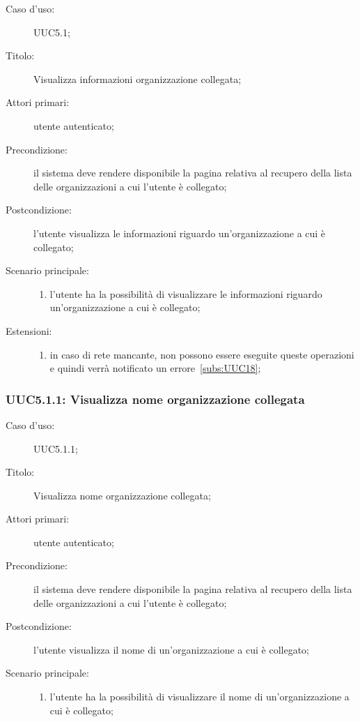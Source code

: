 \documentclass[../../../analisi-dei-requisiti.tex]{subfiles}
\begin{document}
\begin{description}
  \item[Caso d'uso:] UUC5.1;
  \item[Titolo:] Visualizza informazioni organizzazione collegata;
  \item[Attori primari:] utente autenticato;
  \item[Precondizione:] il sistema deve rendere disponibile la pagina relativa al recupero della lista delle organizzazioni a cui l'utente è collegato;
  \item[Postcondizione:] l'utente visualizza le informazioni riguardo un'organizzazione a cui è collegato;
  \item[Scenario principale:]
        \begin{enumerate}
          \item l'utente ha la possibilità di visualizzare le informazioni riguardo un'organizzazione a cui è collegato;
        \end{enumerate}
  \item[Estensioni:]
        \begin{enumerate}
          \item in caso di rete mancante, non possono essere eseguite queste operazioni e quindi verrà notificato un errore~\ref{subs:UUC18};
        \end{enumerate}
\end{description}


\subsubsection{UUC5.1.1: Visualizza nome organizzazione collegata}%
\label{subs:UUC5.1.1}
\begin{description}
  \item[Caso d'uso:] UUC5.1.1;
  \item[Titolo:] Visualizza nome organizzazione collegata;
  \item[Attori primari:] utente autenticato;
  \item[Precondizione:] il sistema deve rendere disponibile la pagina relativa al recupero della lista delle organizzazioni a cui l'utente è collegato;
  \item[Postcondizione:] l'utente visualizza il nome di un'organizzazione a cui è collegato;
  \item[Scenario principale:]
        \begin{enumerate}
          \item l'utente ha la possibilità di visualizzare il nome di un'organizzazione a cui è collegato;
        \end{enumerate}
\end{description}
\end{document}
